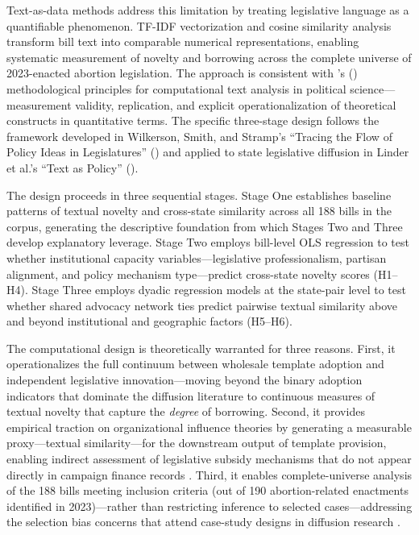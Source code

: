 Text-as-data methods address this limitation by treating legislative language as a quantifiable phenomenon. TF-IDF vectorization and cosine similarity analysis transform bill text into comparable numerical representations, enabling systematic measurement of novelty and borrowing across the complete universe of 2023-enacted abortion legislation. The approach is consistent with \citeauthor{grimmerTextDataPromise2013}'s (\citeyear{grimmerTextDataPromise2013}) methodological principles for computational text analysis in political science---measurement validity, replication, and explicit operationalization of theoretical constructs in quantitative terms. The specific three-stage design follows the framework developed in Wilkerson, Smith, and Stramp's ``Tracing the Flow of Policy Ideas in Legislatures'' (\citeyear{wilkersonTracingFlowPolicy2015}) and applied to state legislative diffusion in Linder et al.'s ``Text as Policy'' (\citeyear{linderTextPolicyMeasuring2020}).

The design proceeds in three sequential stages. Stage One establishes baseline patterns of textual novelty and cross-state similarity across all 188 bills in the corpus, generating the descriptive foundation from which Stages Two and Three develop explanatory leverage. Stage Two employs bill-level OLS regression to test whether institutional capacity variables—legislative professionalism, partisan alignment, and policy mechanism type—predict cross-state novelty scores (H1–H4). Stage Three employs dyadic regression models at the state-pair level to test whether shared advocacy network ties predict pairwise textual similarity above and beyond institutional and geographic factors (H5–H6).

The computational design is theoretically warranted for three reasons. First, it operationalizes the full continuum between wholesale template adoption and independent legislative innovation---moving beyond the binary adoption indicators that dominate the diffusion literature \parencite{berryStateLotteryAdoptions1990} to continuous measures of textual novelty that capture the \textit{degree} of borrowing. Second, it provides empirical traction on organizational influence theories by generating a measurable proxy---textual similarity---for the downstream output of template provision, enabling indirect assessment of legislative subsidy mechanisms that do not appear directly in campaign finance records \parencite{hertel-fernandezStateCapture2019, hallLobbyingLegislativeSubsidy2006a}. Third, it enables complete-universe analysis of the 188 bills meeting inclusion criteria (out of 190 abortion-related enactments identified in 2023)---rather than restricting inference to selected cases---addressing the selection bias concerns that attend case-study designs in diffusion research \parencite{boehmkeStatePolicyInnovativeness2012a}.

